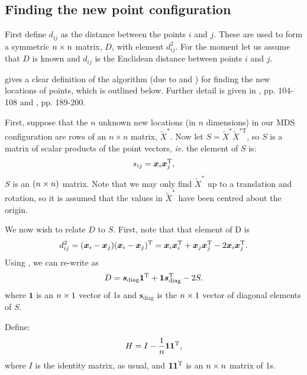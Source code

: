 \subsection{Finding the new point configuration}

First define $d_{ij}$ as the distance between the points $i$ and $j$. These are used to form a symmetric $n \times n$ matrix, $D$, with \ijth element $d^2_{ij}$. For the moment let us assume that $D$ is known and $d_{ij}$ is the Euclidean distance between points $i$ and $j$. 

\cite{diaconis08} gives a clear definition of the algorithm (due to \cite{schoenberg35} and \cite{torgerson}) for finding the new locations of points, which is outlined below. Further detail is given in \cite{principlesofMA}, pp. 104-108 and \cite{chatfieldcollins}, pp. 189-200.

First, suppose that the $n$ unknown new locations (in $n$ dimensions) in our MDS configuration are rows of an $n \times n$ matrix, $\tilde{X}^*$. Now let $S=\tilde{X}^{*} \tilde{X}^{*\text{T}} $, so $S$ is a matrix of scalar products of the point vectors, \emph{ie.} the \ijth element of $S$ is:
\begin{equation}
s_{ij} = \bm{x}_i\bm{x}_j^{\text{T}},
\label{selem}
\end{equation}
$S$ is an $(n\times n)$ matrix. Note that we may only find $\tilde{X}^*$ up to a translation and rotation, so it is assumed that the values in $\tilde{X}^*$ have been centred about the origin.

We now wish to relate $D$ to $S$. First, note that that \ijth element of D is 
\begin{equation}
d_{ij}^2 = (\bm{x}_i-\bm{x}_j)(\bm{x}_i-\bm{x}_j)^{\text{T}} = \bm{x}_i\bm{x}_i^{\text{T}} + \bm{x}_j\bm{x}_j^{\text{T}}  -2 \bm{x}_i\bm{x}_j^{\text{T}}.
\label{dij}
\end{equation}
Using , we can re-write  as
\begin{equation}
D=\bm{s}_\text{diag}\bm{1}^{\text{T}} + \bm{1}\bm{s}_\text{diag}^{\text{T}} -2S.
\label{dijmat}
\end{equation}
where $\bm{1}$ is an $n \times 1$ vector of 1s and $\bm{s}_\text{diag}$ is the $n \times 1$ vector of diagonal elements of $S$.

Define:
\begin{equation}
H = I-\frac{1}{n}\bm{1}\bm{1}^{\text{T}},
\end{equation}
where $I$ is the identity matrix, as usual, and $\bm{1}\bm{1}^{\text{T}}$ is an $n \times n$ matrix of 1s.


